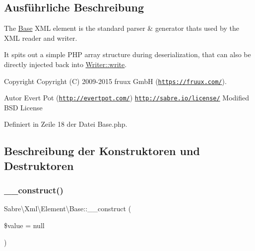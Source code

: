 \subsection{Ausführliche Beschreibung}
The \mbox{\hyperlink{class_sabre_1_1_xml_1_1_element_1_1_base}{Base}} X\+ML element is the standard parser \& generator that\textquotesingle{}s used by the X\+ML reader and writer.

It spits out a simple P\+HP array structure during deserialization, that can also be directly injected back into \mbox{\hyperlink{class_sabre_1_1_xml_1_1_writer_a7ae8afe73ac4ca8d34a609b6ac16da5e}{Writer\+::write}}.

\begin{DoxyCopyright}{Copyright}
Copyright (C) 2009-\/2015 fruux GmbH (\href{https://fruux.com/}{\tt https\+://fruux.\+com/}). 
\end{DoxyCopyright}
\begin{DoxyAuthor}{Autor}
Evert Pot (\href{http://evertpot.com/}{\tt http\+://evertpot.\+com/})  \href{http://sabre.io/license/}{\tt http\+://sabre.\+io/license/} Modified B\+SD License 
\end{DoxyAuthor}


Definiert in Zeile 18 der Datei Base.\+php.



\subsection{Beschreibung der Konstruktoren und Destruktoren}
\mbox{\label{class_sabre_1_1_xml_1_1_element_1_1_base_a6d9aa0c2164fdbef10f6e631fe61dffb}} 
\subsubsection{\texorpdfstring{\+\_\+\+\_\+construct()}{\_\_construct()}}
{\footnotesize\ttfamily Sabre\textbackslash{}\+Xml\textbackslash{}\+Element\textbackslash{}\+Base\+::\+\_\+\+\_\+construct (\begin{DoxyParamCaption}\item[{}]{\$value = {\ttfamily null} }\end{DoxyParamCaption})}


